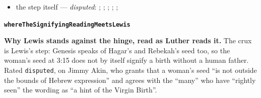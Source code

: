 \documentclass[11pt]{article}
\begin{document}
\begin{itemize}
\begin{itemize}
\item the step itself --- \emph{disputed}: \cite[169]{leupold-exposition-genesis-1942}; \cite[101--102]{keil-delitzsch-pentateuch-1866}; \cite[170]{calvin-commentary-genesis-1847}; \cite[III.23.7]{irenaeus-against-heresies-180}; \cite[V.21.1]{irenaeus-against-heresies-180}; \cite[ad loc. Gen 3:15]{henry-commentary-whole-bible}
\end{itemize}
\end{itemize}
\par\medskip\noindent\textbf{\texttt{where\allowbreak{}The\allowbreak{}Signifying\allowbreak{}Reading\allowbreak{}Meets\allowbreak{}Lewis}}\par\nobreak\noindent
\textbf{Why Lewis stands against the hinge, read as Luther reads it.} The crux is Lewis’s step: Genesis speaks of Hagar’s and Rebekah’s seed too, so the woman’s seed at 3:15 does not by itself signify a birth without a human father. Rated \texttt{disputed}, on Jimmy Akin, who grants that a woman’s seed “is not outside the bounds of Hebrew expression” and agrees with the “many” who have “rightly seen” the wording as “a hint of the Virgin Birth”.
\end{document}
